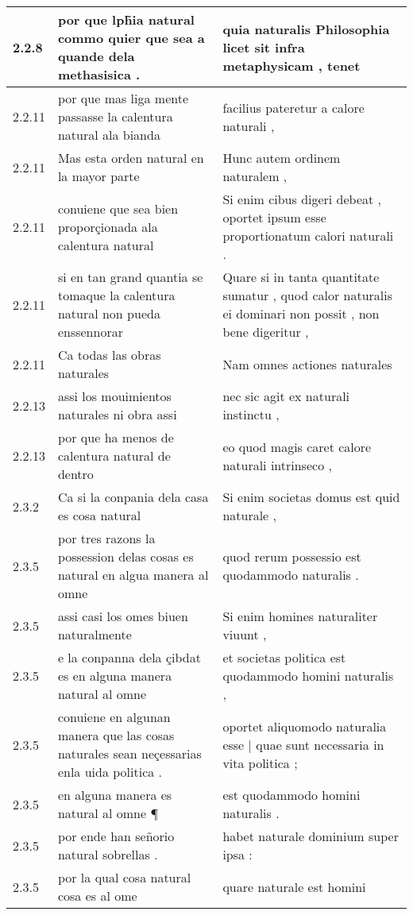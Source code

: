 \begin{tabular}{|p{1cm}|p{6.5cm}|p{6.5cm}|}
2.2.8 & por que lph̃ia natural commo quier que sea a quande dela methasisica . & quia naturalis Philosophia licet sit infra metaphysicam , tenet \\\hline
2.2.11 & por que mas liga mente passasse la calentura natural ala bianda & facilius pateretur a calore naturali , \\\hline
2.2.11 & Mas esta orden natural en la mayor parte & Hunc autem ordinem naturalem , \\\hline
2.2.11 & conuiene que sea bien proporçionada ala calentura natural & Si enim cibus digeri debeat , oportet ipsum esse proportionatum calori naturali . \\\hline
2.2.11 & si en tan grand quantia se tomaque la calentura natural non pueda enssennorar & Quare si in tanta quantitate sumatur , quod calor naturalis ei dominari non possit , non bene digeritur , \\\hline
2.2.11 & Ca todas las obras naturales & Nam omnes actiones naturales \\\hline
2.2.13 & assi los mouimientos naturales ni obra assi & nec sic agit ex naturali instinctu , \\\hline
2.2.13 & por que ha menos de calentura natural de dentro & eo quod magis caret calore naturali intrinseco , \\\hline
2.3.2 & Ca si la conpania dela casa es cosa natural & Si enim societas domus est quid naturale , \\\hline
2.3.5 & por tres razons la possession delas cosas es natural en algua manera al omne & quod rerum possessio est quodammodo naturalis . \\\hline
2.3.5 & assi casi los omes biuen naturalmente & Si enim homines naturaliter viuunt , \\\hline
2.3.5 & e la conpanna dela çibdat es en alguna manera natural al omne & et societas politica est quodammodo homini naturalis , \\\hline
2.3.5 & conuiene en algunan manera que las cosas naturales sean neçessarias enla uida politica . & oportet aliquomodo naturalia esse | quae sunt necessaria in vita politica ; \\\hline
2.3.5 & en alguna manera es natural al omne ¶ & est quodammodo homini naturalis . \\\hline
2.3.5 & por ende han señorio natural sobrellas . & habet naturale dominium super ipsa : \\\hline
2.3.5 & por la qual cosa natural cosa es al ome & quare naturale est homini \\\hline

\end{tabular}
